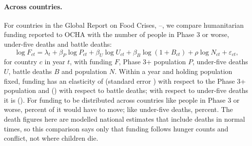 \documentclass[11pt]{article}
\begin{document}
\paragraph{Across countries.} For \xcCountries{} countries in the Global Report on Food Crises, \xcYearZero{}--\xcYearOne{}, we compare humanitarian funding reported to OCHA with the number of people in Phase 3 or worse, under-five deaths and battle deaths:
\begin{equation*}
\log F_{ct} = \lambda_t + \beta_P \log P_{ct} + \beta_U \log U_{ct} + \beta_B \log(1 + B_{ct}) + \rho \log N_{ct} + \varepsilon_{ct},
\end{equation*}
for country $c$ in year $t$, with funding $F$, Phase 3+ population $P$, under-five deaths $U$, battle deaths $B$ and population $N$. Within a year and holding population fixed, funding has an elasticity of \xcElastPthree{} (standard error \xcElastPthreeSe{}) with respect to the Phase 3+ population and \xcElastBattle{} (\xcElastBattleSe{}) with respect to battle deaths; with respect to under-five deaths it is \xcElastUfive{} (\xcElastUfiveSe{}). For funding to be distributed across countries like people in Phase 3 or worse, \xcDisPthree{} percent of it would have to move; like under-five deaths, \xcDisUfive{} percent. The death figures here are modelled national estimates that include deaths in normal times, so this comparison says only that funding follows hunger counts and conflict, not where children die.
\end{document}
